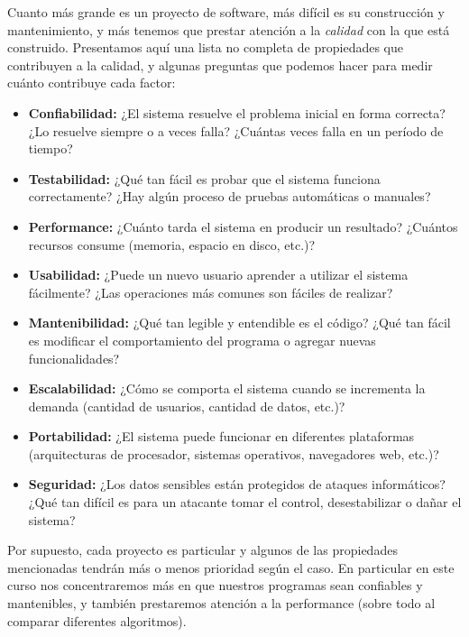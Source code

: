 Cuanto más grande es un proyecto de software, más difícil es su construcción y
mantenimiento, y más tenemos que prestar atención a la \emph{calidad} con la
que está construido. Presentamos aquí una lista no completa de propiedades que
contribuyen a la calidad, y algunas preguntas que podemos hacer para medir
cuánto contribuye cada factor:

\begin{itemize}
        \item {\bf Confiabilidad:} ¿El sistema resuelve el problema inicial en
            forma correcta? ¿Lo resuelve siempre o a veces falla? ¿Cuántas
            veces falla en un período de tiempo?
        \item {\bf Testabilidad:} ¿Qué tan fácil es probar que el sistema
            funciona correctamente? ¿Hay algún proceso de pruebas automáticas o
            manuales?
        \item {\bf Performance:} ¿Cuánto tarda el sistema en producir un
            resultado? ¿Cuántos recursos consume (memoria, espacio en disco,
            etc.)?
        \item {\bf Usabilidad:} ¿Puede un nuevo usuario aprender a utilizar el
            sistema fácilmente? ¿Las operaciones más comunes son fáciles de
            realizar?
        \item {\bf Mantenibilidad:} ¿Qué tan legible y entendible es el código?
            ¿Qué tan fácil es modificar el comportamiento del programa o
            agregar nuevas funcionalidades?
        \item {\bf Escalabilidad:} ¿Cómo se comporta el sistema cuando
            se incrementa la demanda (cantidad de usuarios, cantidad de datos,
            etc.)?
        \item {\bf Portabilidad:} ¿El sistema puede funcionar en diferentes
            plataformas (arquitecturas de procesador, sistemas operativos,
            navegadores web, etc.)?
        \item {\bf Seguridad:} ¿Los datos sensibles están protegidos de ataques
            informáticos? ¿Qué tan difícil es para un atacante tomar el control,
            desestabilizar o dañar el sistema?
\end{itemize}

Por supuesto, cada proyecto es particular y algunos de las propiedades
mencionadas tendrán más o menos prioridad según el caso. En particular en este
curso nos concentraremos más en que nuestros programas sean confiables y
mantenibles, y también prestaremos atención a la performance (sobre todo al
comparar diferentes algoritmos).

